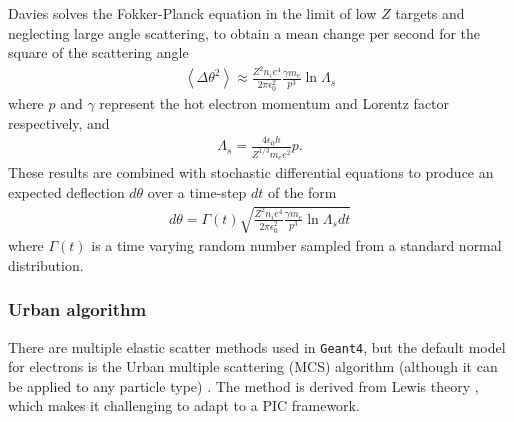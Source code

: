 \documentclass[12pt]{article}
\numberwithin{equation}{section}
\begin{document}
Davies solves the Fokker-Planck equation in the limit of low $Z$ targets and neglecting large angle scattering, to obtain a mean change per second for the square of the scattering angle
%
\begin{align}
  \left\langle \Delta\theta^2 \right\rangle \approx \frac{Z^2 n_i e^4}{2 \pi \epsilon_0^2} \frac{\gamma m_e}{p^3} \ln\Lambda_s
\end{align}
%
where $p$ and $\gamma$ represent the hot electron momentum and Lorentz factor respectively, and 
%
\begin{align}
\Lambda_s = \frac{4\epsilon_0h}{Z^{1/3}m_ee^2}p.
\end{align}
%
These results are combined with stochastic differential equations to produce an expected deflection $d\theta$ over a time-step $dt$ of the form
%
\begin{align}
  d\theta = \Gamma(t)\sqrt{\frac{Z^2n_ie^4}{2\pi\epsilon_0^2}\frac{\gamma m_e}{p^3}\ln\Lambda_sdt}
\end{align}
%
where $\Gamma(t)$ is a time varying random number sampled from a standard normal distribution.

\subsubsection{Urban algorithm} \label{sec:theory:elastic:Urban}

There are multiple elastic scatter methods used in \texttt{Geant4}, but the default model for electrons is the Urban multiple scattering (MCS) algorithm (although it can be applied to any particle type) \cite{code:geant4:Urban}. The method is derived from Lewis theory \cite{code:geant4:Lewis}, which makes it challenging to adapt to a PIC framework.
\end{document}
